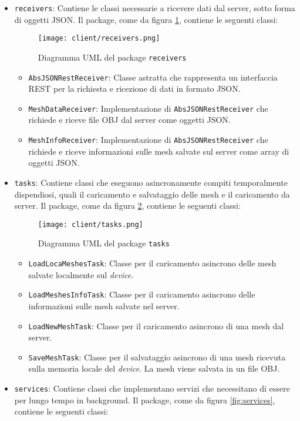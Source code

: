 \begin{itemize}
\item\texttt{receivers}: Contiene le classi necessarie a ricevere dati dal server, sotto forma di oggetti JSON. Il package, come da figura \ref{fig:receivers}, contiene le seguenti classi:
\begin{figure}[!h] 
    \centering 
    \texttt{[image: client/receivers.png]} 
    \caption{Diagramma UML del package \texttt{receivers}}
   \label{fig:receivers}
\end{figure}
\begin{itemize}
	\item\texttt{AbsJSONRestReceiver}: Classe astratta che rappresenta un interfaccia REST per la richiesta e ricezione di dati in formato JSON.
	\item\texttt{MeshDataReceiver}: Implementazione di \texttt{AbsJSONRestReceiver} che richiede e riceve file OBJ dal server come oggetti JSON.
	\item\texttt{MeshInfoReceiver}: Implementazione di \texttt{AbsJSONRestReceiver} che richiede e riceve informazioni sulle mesh salvate sul server come array di oggetti JSON.
	\end{itemize}
\item\texttt{tasks}: Contiene classi che eseguono asincronamente compiti temporalmente dispendiosi, quali il caricamento e salvataggio delle mesh e il caricamento da server. Il package, come da figura \ref{fig:tasks}, contiene le seguenti classi:
\begin{figure}[!h] 
    \centering 
    \texttt{[image: client/tasks.png]} 
    \caption{Diagramma UML del package \texttt{tasks}}
   \label{fig:tasks}
\end{figure}
	\begin{itemize}
	\item\texttt{LoadLocaMeshesTask}: Classe per il caricamento asincrono delle mesh salvate localmente sul \emph{device}.
	\item\texttt{LoadMeshesInfoTask}: Classe per il caricamento asincrono delle informazioni sulle mesh salvate nel server. 
	\item\texttt{LoadNewMeshTask}: Classe per il caricamento asincrono di una mesh dal server.
	\item\texttt{SaveMeshTask}: Classe per il salvataggio asincrono di una mesh ricevuta sulla memoria locale del \emph{device}. La mesh viene salvata in un file OBJ.
	\end{itemize}
\item\texttt{services}: Contiene classi che implementano servizi che necessitano di essere per lungo tempo in background. Il package, come da figura \ref{fig:services}, contiene le seguenti classi:

\end{itemize}
